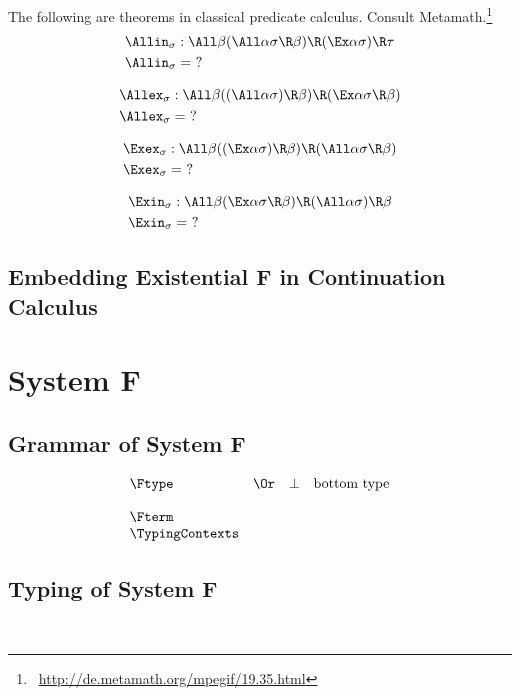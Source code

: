 \documentclass{amsart}
\begin{document}
The following are theorems in classical predicate calculus.
Consult Metamath.\footnote{
~\url{http://de.metamath.org/mpegif/19.35.html}
}
\begin{align*}
\Allin_\sigma & : \All\beta
  (\All\alpha \sigma\R\beta) \R
  (\Ex\alpha \sigma) \R \tau
  \\
\Allin_\sigma & = ~?
\end{align*}

\begin{align*}
\Allex_\sigma & : \All\beta
  ((\All\alpha\sigma) \R \beta) \R
  (\Ex\alpha \sigma \R \beta)
  \\
\Allex_\sigma & = ~?
\end{align*}

\begin{align*}
\Exex_\sigma & : \All\beta
  ((\Ex\alpha \sigma) \R \beta) \R
  (\All\alpha \sigma \R \beta)
  \\
\Exex_\sigma & = ~?
\end{align*}

\begin{align*}
\Exin_\sigma & : \All\beta
  (\Ex\alpha \sigma \R \beta) \R
  (\All\alpha\sigma) \R \beta
  \\
\Exin_\sigma & = ~?
\end{align*}

\subsection{Embedding Existential F in Continuation Calculus}
\label{sec:desugar}

\section{System F}

\subsection{Grammar of System F}

\[
\begin{array}{lclr}
\Ftype
&\Or& \bot & \mbox{bottom type} \\
\\
\Fterm
\\
\TypingContexts
\end{array}
\]

\subsection{Typing of System F}
~
\end{document}
